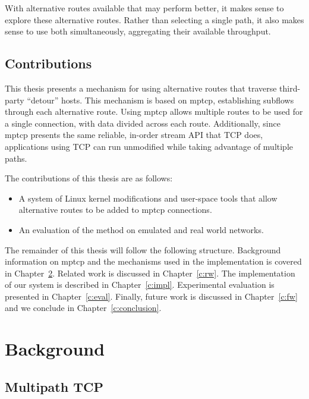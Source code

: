 \documentclass{cwru}
\begin{document}
With alternative routes available that may perform better, it makes sense to
explore these alternative routes. Rather than selecting a single path, it also
makes sense to use both simultaneously, aggregating their available throughput.

\section{Contributions}

This thesis presents a mechanism for using alternative routes that traverse
third-party ``detour'' hosts. This mechanism is based on \ac{mptcp},
establishing subflows through each alternative route. Using \ac{mptcp} allows
multiple routes to be used for a single connection, with data divided across
each route. Additionally, since \ac{mptcp} presents the same reliable, in-order
stream API that TCP does, applications using TCP can run unmodified while taking
advantage of multiple paths.

The contributions of this thesis are as follows:
\begin{itemize}
\item A system of Linux kernel modifications and user-space tools that allow
  alternative routes to be added to \ac{mptcp} connections.
\item An evaluation of the method on emulated and real world networks.
\end{itemize}

The remainder of this thesis will follow the following structure. Background
information on \ac{mptcp} and the mechanisms used in the implementation is
covered in Chapter~\ref{c:bg}. Related work is discussed in Chapter~\ref{c:rw}.
The implementation of our system is described in Chapter~\ref{c:impl}.
Experimental evaluation is presented in Chapter~\ref{c:eval}. Finally, future
work is discussed in Chapter~\ref{c:fw} and we conclude in
Chapter~\ref{c:conclusion}.

\chapter{Background}
\label{c:bg}

\section{Multipath TCP}
\end{document}
